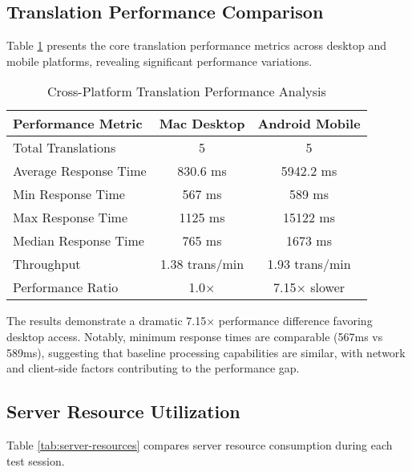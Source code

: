 \documentclass[conference]{IEEEtran}
\begin{document}
\subsection{Translation Performance Comparison}

Table \ref{tab:translation-performance} presents the core translation performance metrics across desktop and mobile platforms, revealing significant performance variations.

\begin{table}[htbp]
\centering
\caption{Cross-Platform Translation Performance Analysis}
\label{tab:translation-performance}
\begin{tabular}{@{}lcc@{}}
\toprule
Performance Metric & Mac Desktop & Android Mobile \\
\midrule
Total Translations & 5 & 5 \\
Average Response Time & 830.6 ms & 5942.2 ms \\
Min Response Time & 567 ms & 589 ms \\
Max Response Time & 1125 ms & 15122 ms \\
Median Response Time & 765 ms & 1673 ms \\
Throughput & 1.38 trans/min & 1.93 trans/min \\
Performance Ratio & 1.0× & 7.15× slower \\
\bottomrule
\end{tabular}
\end{table}

The results demonstrate a dramatic 7.15× performance difference favoring desktop access. Notably, minimum response times are comparable (567ms vs 589ms), suggesting that baseline processing capabilities are similar, with network and client-side factors contributing to the performance gap.

\subsection{Server Resource Utilization}

Table \ref{tab:server-resources} compares server resource consumption during each test session.
\end{document}
